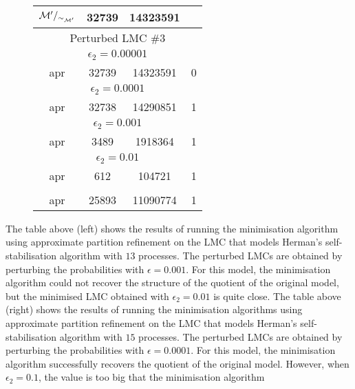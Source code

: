 \begin{figure}[h!]
\begin{floatrow}
{\begin{tabular}{|c|c|c|c|}
				$\mathcal{M}'/_{\sim_{\mathcal{M}'}}$     & 	32739 &	14323591    & \\
				\hline
				\multicolumn{4}{|c|}{Perturbed LMC \#3}\\ 
				\hline
				\multicolumn{4}{|c|}{$\epsilon_2 = 0.00001$}\\
				\hline
				apr		&  32739 &	14323591 &	0\\
				\hline
				\multicolumn{4}{|c|}{$\epsilon_2 = 0.0001$}\\
				\hline
				apr		&  32738 &	14290851&	1\\
				\hline			
				\multicolumn{4}{|c|}{$\epsilon_2 =  0.001$}\\
				\hline
				apr		 &  3489 &	1918364	& 1 \\
				\hline		
				\multicolumn{4}{|c|}{$\epsilon_2 =  0.01$}\\
				\hline
				\rowcolor{yellow}
				apr		 &  612	& 104721 &	1\\
				\rowcolor{white}
				\hline					
				\multicolumn{4}{|c|}{$\epsilon_2 = 0.1$}\\
				\hline
				\rowcolor{red!40}
				apr		 &  25893	& 11090774	& 1\\
				\hline
			\end{tabular}	
		}{}
	\end{floatrow}
\end{figure}


The table above (left) shows the results of running the minimisation algorithm using approximate partition refinement on the LMC that models Herman's self-stabilisation algorithm with $13$ processes. The perturbed LMCs are obtained by perturbing the probabilities with $\epsilon = 0.001$. For this model, the minimisation algorithm could not recover the structure of the quotient of the original model, but the minimised LMC obtained with $\epsilon_2 = 0.01$ is quite close. The table above (right) shows the results of running the minimisation algorithms using approximate partition refinement on the LMC that models Herman's self-stabilisation algorithm with $15$ processes. The perturbed LMCs are obtained by perturbing the probabilities with $\epsilon = 0.0001$. For this model, the minimisation algorithm successfully recovers the quotient of the original model. However, when $\epsilon_2 = 0.1$, the value is too big that the minimisation algorithm



